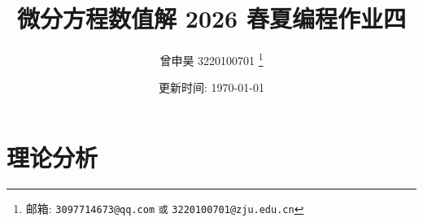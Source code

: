 \documentclass[a4paper]{article}
\begin{document}
\title{微分方程数值解 2026 春夏编程作业四}

\author{曾申昊 3220100701
  \thanks{邮箱: \texttt{3097714673@qq.com}
                            \texttt{或} \texttt{3220100701@zju.edu.cn}}}

\date{更新时间: \today}

\maketitle


\section{理论分析}
\end{document}

